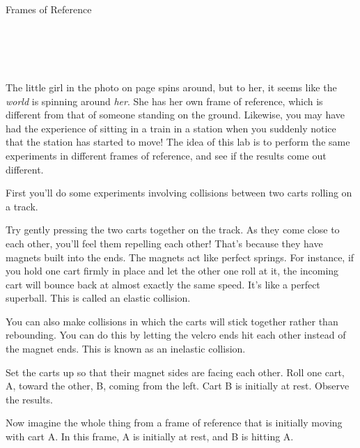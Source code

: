 \begin{lab}{Frames of Reference}
\apparatus
{}\\
\\
\\
\\
\\

\labintroduction

The little girl in the photo on page \pageref{ch:symmetry} spins around, but to her, it seems
like the \emph{world} is spinning around \emph{her}. She has her own frame of reference,
which is different from that of someone standing on the ground. Likewise, you
may have had the experience of sitting in a train in a station when you suddenly notice that
the station has started to move!
The idea of this lab is to perform the same experiments in different frames of reference, and
see if the results come out different.


First you'll do some experiments involving collisions between two
carts rolling on a track.

Try gently pressing the two carts together on the track. As they come close to each
 other, you'll feel them repelling each other! That's because they have magnets built
 into the ends. The magnets act like perfect springs. For instance, if you hold one cart
 firmly in place and let the other one roll at it, the incoming cart will bounce back at almost exactly
 the same speed. It's like a perfect superball. This is called an elastic collision.

You can also make collisions in which the carts will stick together rather than rebounding.
You can do this by letting the velcro ends hit each other instead of the magnet ends. 
This is known as an inelastic collision.

Set the carts up so that their magnet sides are facing each other.
Roll one cart, A, toward the other, B, coming from the left. Cart B
is initially at rest. Observe the results.

Now imagine the whole thing from a frame of reference that is initially moving
with cart A. In this frame, A is initially at rest, and B is hitting A.


\end{lab}
